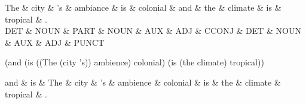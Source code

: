 \documentclass{article}
\begin{document}
\begin{dependency}
	\begin{deptext}
	  The \& city \& 's \& ambiance \& is \& colonial \& and \& the
		 \& climate \& is \& tropical \& . \\	 
	  DET \& NOUN \& PART \& NOUN \& AUX \& ADJ \& CCONJ \& DET
	     \& NOUN \& AUX \& ADJ \& PUNCT \\
	\end{deptext}
	
	
	
	
	
\end{dependency}
	
(and (is ((The (city 's)) ambience) colonial) (is (the climate) tropical))


\begin{dependency}
	\begin{deptext}[column sep=14pt]
		and \& is \& The \& city \& 's \& ambience \& colonial \& is 
		\& the \& climate \& tropical \& . \\	 
	\end{deptext}
	



	
	
	
	
	
\end{dependency}




	\closeout\txhslFile
\end{document}
